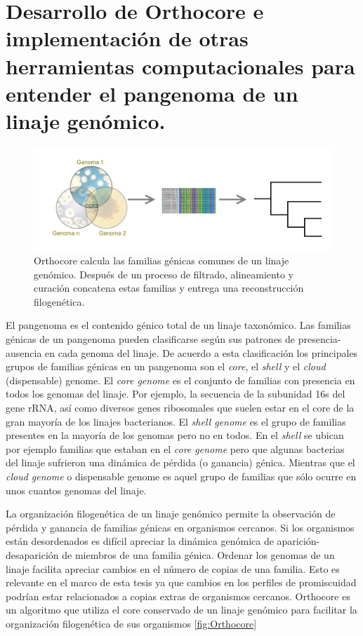 \documentclass[]{article}
\title{}
\author{}
\date{}
\begin{document}
\section{Desarrollo de Orthocore e implementación de otras herramientas
computacionales para entender el pangenoma de un linaje
genómico.}\label{desarrollo-de-orthocore-e-implementacion-de-otras-herramientas-computacionales-para-entender-el-pangenoma-de-un-linaje-genomico.}

\begin{figure}[h!tbp]
\centering
\includegraphics[angle = 0,scale = .42]{chapter1/coreWiki.png}
\caption[Orthocore calcula el core de un linaje genómico para proveer una filogenia]{\footnotesize{Orthocore calcula las familias génicas comunes de un linaje genómico. Después de un proceso de filtrado, alineamiento y curación concatena estas familias y entrega una reconstrucción filogenética.}}
\label{fig:Orthocore}
\end{figure}

El pangenoma es el contenido génico total de un linaje taxonómico. Las
familias génicas de un pangenoma pueden clasificarse según sus patrones
de presencia-ausencia en cada genoma del linaje. De acuerdo a esta
clasificación los principales grupos de familias génicas en un pangenoma
son el \emph{core}, el \emph{shell} y el \emph{cloud} (dispensable)
genome. El \emph{core genome} es el conjunto de familias con presencia
en todos los genomas del linaje. Por ejemplo, la secuencia de la
subunidad 16s del gene rRNA, así como diversos genes ribosomales que
suelen estar en el core de la gran mayoría de los linajes bacterianos.
El \emph{shell genome} es el grupo de familias presentes en la mayoría
de los genomas pero no en todos. En el \emph{shell} se ubican por
ejemplo familias que estaban en el \emph{core genome} pero que algunas
bacterias del linaje sufrieron una dinámica de pérdida (o ganancia)
génica. Mientras que el \emph{cloud genome} o dispensable genome es
aquel grupo de familias que sólo ocurre en unos cuantos genomas del
linaje.

La organización filogenética de un linaje genómico permite la
observación de pérdida y ganancia de familias génicas en organismos
cercanos. Si los organismos están desordenados es difícil apreciar la
dinámica genómica de aparición-desaparición de miembros de una familia
génica. Ordenar los genomas de un linaje facilita apreciar cambios en el
número de copias de una familia. Esto es relevante en el marco de esta
tesis ya que cambios en los perfiles de promiscuidad podrían estar
relacionados a copias extras de organismos cercanos. Orthocore es un
algoritmo que utiliza el core conservado de un linaje genómico para
facilitar la organización filogenética de sus organismos
\autoref{fig:Orthocore}
\end{document}
